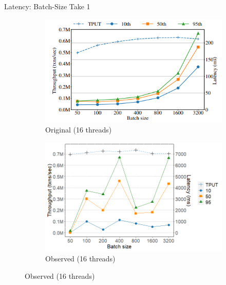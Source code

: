 \documentclass[notes, xcolor=dvipsnames]{beamer}
\begin{document}
    \begin{frame}{Latency: Batch-Size Take 1}
        \begin{figure}
            \begin{subfigure}[h]{0.4\linewidth}
                \includegraphics[scale=0.50]{rolis_fig16.png}
                \caption{Original (16 threads)}
            \end{subfigure}
            \hfill
            \begin{subfigure}[h]{0.5\linewidth}
                \includegraphics[scale=0.30]{fig16_16t.png}
                \caption{Observed (16 threads)}
            \end{subfigure}
        \end{figure}
    \end{frame}
\end{document}
